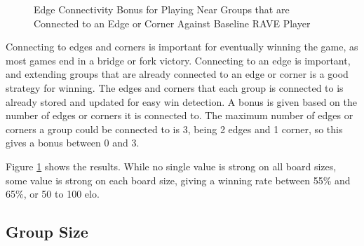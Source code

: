 \begin{figure}
	\centering
{}
	\caption[Edge Connectivity Bonus]{Edge Connectivity Bonus for Playing Near Groups that are Connected to an Edge or Corner Against Baseline RAVE Player}
	\label{fig:connectivity}
\end{figure}

Connecting to edges and corners is important for eventually winning the game, as most games end in a bridge or fork victory. Connecting to an edge is important, and extending groups that are already connected to an edge or corner is a good strategy for winning. The edges and corners that each group is connected to is already stored and updated for easy win detection. A bonus is given based on the number of edges or corners it is connected to. The maximum number of edges or corners a group could be connected to is 3, being 2 edges and 1 corner, so this gives a bonus between 0 and 3.

Figure \ref{fig:connectivity} shows the results. While no single value is strong on all board sizes, some value is strong on each board size, giving a winning rate between 55\% and 65\%, or 50 to 100 elo.



\subsection{Group Size}


